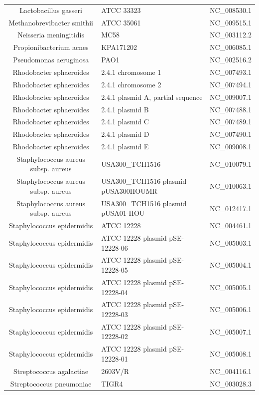 \documentclass[10pt]{bmc_article}
\newenvironment{bmcformat}{\begin{raggedright}\baselineskip20pt\sloppy\setboolean{publ}{false}}{\end{raggedright}\baselineskip20pt\sloppy}
\begin{document}
\begin{bmcformat}
{\begin{tabular}{|c|p{5cm}|c|}
        Lactobacillus gasseri & ATCC 33323 &      NC\_008530.1 \\
        Methanobrevibacter smithii & ATCC 35061 &  NC\_009515.1 \\
        Neisseria meningitidis & MC58 &   NC\_003112.2 \\
        Propionibacterium acnes & KPA171202 &     NC\_006085.1 \\
        Pseudomonas aeruginosa &  PAO1 &   NC\_002516.2 \\
        Rhodobacter sphaeroides & 2.4.1 chromosome 1 &  NC\_007493.1 \\
        Rhodobacter sphaeroides & 2.4.1 chromosome 2 &  NC\_007494.1 \\
        Rhodobacter sphaeroides & 2.4.1 plasmid A, partial sequence &      NC\_009007.1 \\
        Rhodobacter sphaeroides & 2.4.1 plasmid B &     NC\_007488.1 \\
        Rhodobacter sphaeroides & 2.4.1 plasmid C &     NC\_007489.1 \\
        Rhodobacter sphaeroides & 2.4.1 plasmid D &     NC\_007490.1 \\
        Rhodobacter sphaeroides & 2.4.1 plasmid E &     NC\_009008.1 \\
        Staphylococcus aureus subsp. aureus & USA300\_TCH1516 &    NC\_010079.1 \\
        Staphylococcus aureus subsp. aureus & USA300\_TCH1516 plasmid pUSA300HOUMR &      NC\_010063.1 \\
        Staphylococcus aureus subsp. aureus & USA300\_TCH1516 plasmid pUSA01-HOU &       NC\_012417.1 \\
        Staphylococcus epidermidis & ATCC 12228 &  NC\_004461.1 \\
        Staphylococcus epidermidis & ATCC 12228 plasmid pSE-12228-06 &   NC\_005003.1 \\
        Staphylococcus epidermidis & ATCC 12228 plasmid pSE-12228-05 &   NC\_005004.1 \\
        Staphylococcus epidermidis & ATCC 12228 plasmid pSE-12228-04 &   NC\_005005.1 \\
        Staphylococcus epidermidis & ATCC 12228 plasmid pSE-12228-03 &   NC\_005006.1 \\
        Staphylococcus epidermidis & ATCC 12228 plasmid pSE-12228-02 &   NC\_005007.1 \\
        Staphylococcus epidermidis & ATCC 12228 plasmid pSE-12228-01 &   NC\_005008.1 \\
        Streptococcus agalactiae & 2603V/R & NC\_004116.1 \\
        Streptococcus pneumoniae & TIGR4 & NC\_003028.3 \\
        \hline
      \end{tabular}
      }

\end{bmcformat}
\end{document}
